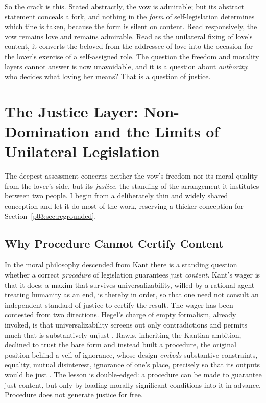 \documentclass[11pt,a4paper]{article}
\begin{document}
So the crack is this. Stated abstractly, the vow is admirable; but its abstract statement conceals a fork, and nothing in the \emph{form} of self-legislation determines which tine is taken, because the form is silent on content. Read responsively, the vow remains love and remains admirable. Read as the unilateral fixing of love's content, it converts the beloved from the addressee of love into the occasion for the lover's exercise of a self-assigned role. The question the freedom and morality layers cannot answer is now unavoidable, and it is a question about \emph{authority}: who decides what loving her means? That is a question of justice.

\section{The Justice Layer: Non-Domination and the Limits of Unilateral Legislation}\label{p03:sec:justice}

The deepest assessment concerns neither the vow's freedom nor its moral quality from the lover's side, but its \emph{justice}, the standing of the arrangement it institutes between two people. I begin from a deliberately thin and widely shared conception and let it do most of the work, reserving a thicker conception for Section~\ref{p03:sec:regrounded}.

\subsection{Why Procedure Cannot Certify Content}

In the moral philosophy descended from Kant there is a standing question whether a correct \emph{procedure} of legislation guarantees just \emph{content}. Kant's wager is that it does: a maxim that survives universalizability, willed by a rational agent treating humanity as an end, is thereby in order, so that one need not consult an independent standard of justice to certify the result. The wager has been contested from two directions. Hegel's charge of empty formalism, already invoked, is that universalizability screens out only contradictions and permits much that is substantively unjust \parencite[§135]{hegel1820right}. Rawls, inheriting the Kantian ambition, declined to trust the bare form and instead built a procedure, the original position behind a veil of ignorance, whose design \emph{embeds} substantive constraints, equality, mutual disinterest, ignorance of one's place, precisely so that its outputs would be just \parencite{rawls1971theory}. The lesson is double-edged: a procedure can be made to guarantee just content, but only by loading morally significant conditions into it in advance. Procedure does not generate justice for free.
\end{document}
